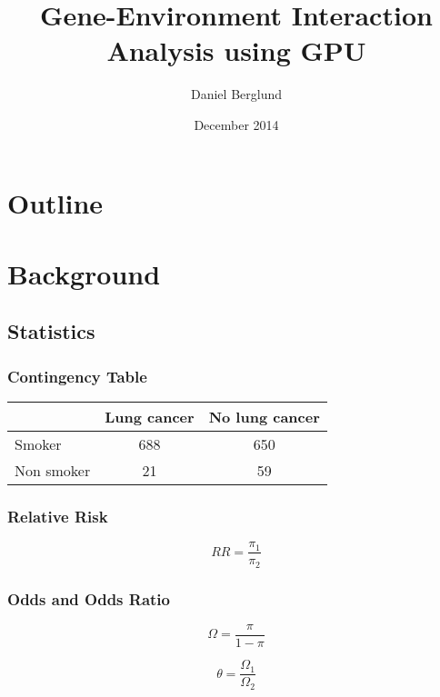 \documentclass{beamer}
\title{Gene-Environment Interaction Analysis using GPU}
\author{Daniel Berglund}
\date{December 2014}
\begin{document}
\begin{frame}
 \titlepage
\end{frame}

\section*{Outline}
\begin{frame}
 \tableofcontents
\end{frame}

\section{Background}



\subsection{Statistics}

\begin{frame}
\frametitle{Contingency Table}
 \begin{table}[h]
 \centering
\begin{tabular}{| l c c |}
  \hline
  & Lung cancer & No lung cancer\\
  \hline
  Smoker & 688 & 650 \\
  Non smoker & 21 & 59 \\
  \hline  
\end{tabular}
\label{table:contingency_table}
\end{table}
\end{frame}

\begin{frame}
\frametitle{Relative Risk}

\begin{equation*}
RR=\frac{\pi_1}{\pi_2}
\end{equation*}

\end{frame}

\begin{frame}
\frametitle{Odds and Odds Ratio}

\begin{equation*}\label{eq:odds}
\Omega=\frac{\pi}{1-\pi}
\end{equation*}

\begin{equation*}\label{eq:odds_ratio}
\theta=\frac{\Omega_1}{\Omega_2}
\end{equation*}

\end{frame}
\end{document}
